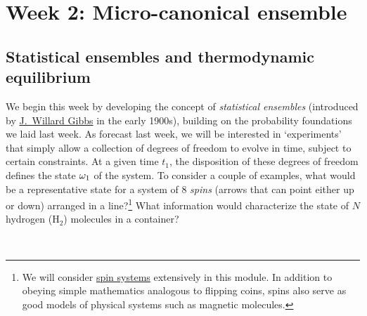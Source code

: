 \renewcommand{\thisweek}{MATH327 Week 2}
\renewcommand{\moddate}{Last modified 6 Feb.~2021}
\setcounter{section}{2}
\setcounter{subsection}{0}
{}
\section*{Week 2: Micro-canonical ensemble}

\subsection{Statistical ensembles and thermodynamic equilibrium}
We begin this week by developing the concept of \textit{statistical ensembles} (introduced by \href{https://en.wikipedia.org/wiki/Josiah_Willard_Gibbs}{J.\ Willard Gibbs} in the early 1900s), building on the probability foundations we laid last week.
As forecast last week, we will be interested in `experiments' that simply allow a collection of degrees of freedom to evolve in time, subject to certain constraints.
At a given time $t_1$, the disposition of these degrees of freedom defines the state $\omega_1$ of the system.
To consider a couple of examples, what would be a representative state for a system of $8$ \textit{spins} (arrows that can point either up or down) arranged in a line?\footnote{We will consider \href{https://en.wikipedia.org/wiki/Spin_model}{spin systems} extensively in this module.  In addition to obeying simple mathematics analogous to flipping coins, spins also serve as good models of physical systems such as magnetic molecules.}
What information would characterize the state of $N$ hydrogen (H$_2$) molecules in a container?
\begin{mdframed}
  \ \\[100 pt]
\end{mdframed}

